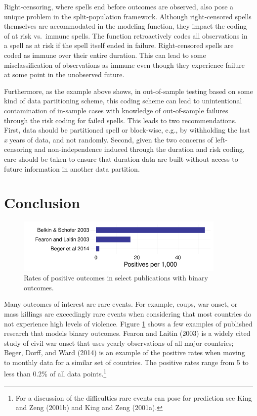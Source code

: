 \documentclass[article]{jss}
\begin{document}
Right-censoring, where spells end before outcomes are observed, also
pose a unique problem in the split-population framework. Although
right-censored spells themselves are accommodated in the modeling
function, they impact the coding of at risk vs.~immune spells. The
 function retroactively codes all observations in
a spell as at risk if the spell itself ended in failure. Right-censored
spells are coded as immune over their entire duration. This can lead to
some misclassification of observations as immune even though they
experience failure at some point in the unobserved future.

Furthermore, as the example above shows, in out-of-sample testing based
on some kind of data partitioning scheme, this coding scheme can lead to
unintentional contamination of in-sample cases with knowledge of
out-of-sample failures through the risk coding for failed spells. This
leads to two recommendations. First, data should be partitioned spell or
block-wise, e.g., by withholding the last \emph{x} years of data, and
not randomly. Second, given the two concerns of left-censoring and
non-independence induced through the duration and risk coding, care
should be taken to ensure that duration data are built without access to
future information in another data partition.

\section{Conclusion}\label{conclusion}

\begin{figure}[htbp!]
\centering
\includegraphics[width = 4in]{graphics/rates.pdf}
\caption{Rates of positive outcomes in select publications with binary outcomes.}
\label{rates}
\end{figure}

Many outcomes of interest are rare events. For example, coups, war
onset, or mass killings are exceedingly rare events when considering
that most countries do not experience high levels of violence. Figure
\ref{rates} shows a few examples of published research that models
binary outcomes. Fearon and Laitin (2003) is a widely cited study of
civil war onset that uses yearly observations of all major countries;
Beger, Dorff, and Ward (2014) is an example of the positive rates when
moving to monthly data for a similar set of countries. The positive
rates range from 5 to less than 0.2\% of all data points.\footnote{For a
  discussion of the difficulties rare events can pose for prediction see
  King and Zeng (2001b) and King and Zeng (2001a).}
\end{document}
